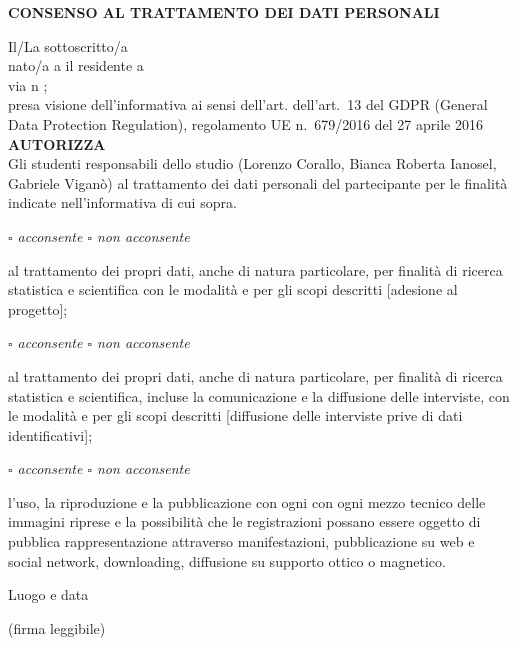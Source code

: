 \documentclass[10pt,a4paper]{article}
\newcommand{\sezione}[1]{\par\needspace{4\baselineskip}\textbf{#1}\par}
\newcommand{\scelta}[1]{%
  \par{\sffamily\itshape\small $\square$ acconsente $\square$ non acconsente\par #1\par}}
\begin{document}
\bigskip\bigskip
\sezione{CONSENSO AL TRATTAMENTO DEI DATI PERSONALI}
Il/La sottoscritto/a \dotfill\\
nato/a a \makebox[3.5cm]{\dotfill} il\makebox[4.5cm]{\dotfill} residente a
\makebox[5cm]{\dotfill}\\
via\makebox[9cm]{\dotfill} n\makebox[1.2cm]{\dotfill} ;\\
presa visione dell'informativa ai sensi dell'art. dell'art.~13 del GDPR (General Data Protection
Regulation), regolamento UE n.~679/2016 del 27 aprile 2016\\
\textbf{AUTORIZZA}\\
Gli studenti responsabili dello studio (Lorenzo Corallo, Bianca Roberta Ianosel, Gabriele
Viganò) al trattamento dei dati personali del partecipante per le finalità indicate
nell'informativa di cui sopra.

\scelta{al trattamento dei propri dati, anche di natura particolare, per finalità di ricerca
statistica e scientifica con le modalità e per gli scopi descritti [adesione al progetto];}
\scelta{al trattamento dei propri dati, anche di natura particolare, per finalità di ricerca
statistica e scientifica, incluse la comunicazione e la diffusione delle interviste, con le
modalità e per gli scopi descritti [diffusione delle interviste prive di dati
identificativi];}
\scelta{l'uso, la riproduzione e la pubblicazione con ogni con ogni mezzo tecnico delle immagini
riprese e la possibilità che le registrazioni possano essere oggetto di pubblica
rappresentazione attraverso manifestazioni, pubblicazione su web e social network,
downloading, diffusione su supporto ottico o magnetico.}

\bigskip
Luogo e data \makebox[6cm]{\dotfill}

\bigskip
(firma leggibile) \makebox[6cm]{\dotfill}
\end{document}
